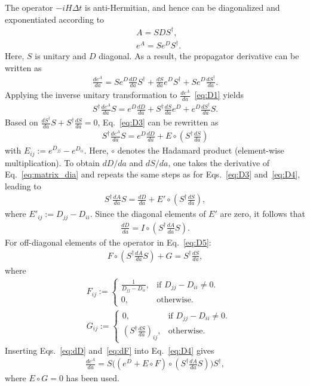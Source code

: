 \begin{appendices}
The operator $-iH\Delta t$ is anti-Hermitian, and hence can be diagonalized and exponentiated according to 
\begin{align}
\label{eq:matrix_dia}    &A=SDS^\dagger,\\
    &e^A=Se^DS^\dagger.
\end{align}
Here, $S$ is unitary and $D$ diagonal. As a result, the propagator derivative can be written as
\begin{align}
\label{eq:D1}
    \frac{d e^{A}}{d a}=Se^D\frac{dD}{da}S^\dagger+\frac{dS}{da}e^DS^\dagger+Se^D\frac{dS^\dagger}{da}.
\end{align}
Applying the inverse unitary transformation to $\frac{d e^{A}}{d a}$~\eqref{eq:D1} yields
\begin{align}
\label{eq:D3}
    S^\dagger\frac{de^A}{da}S=e^D\frac{dD}{da}+S^\dagger\frac{dS}{da}e^D+e^D\frac{dS^\dagger}{da}S.
\end{align}
Based on $\frac{dS^\dagger}{da}S+S^\dagger\frac{dS}{da}=0$, Eq.~\eqref{eq:D3} can be rewritten as 
\begin{align}
\label{eq:D4}
    S^\dagger \frac{de^A}{da}S=e^D\frac{dD}{da}+E\circ(S^\dagger\frac{dS}{da})
\end{align}
with $E_{ij}:=e^{D_{jj}}-e^{D_{ii}}$. Here, $\circ$ denotes the Hadamard product (element-wise multiplication). To obtain $dD/da$ and $dS/da$, one takes the derivative of Eq.~\eqref{eq:matrix_dia} and repeats the same steps as for Eqs.~\eqref{eq:D3} and~\eqref{eq:D4}, leading to
\begin{align}
\label{eq:D5}
    S^\dagger\frac{dA}{da}S=\frac{dD}{da}+E'\circ(S^\dagger\frac{dS}{da}),
\end{align}
where $E'_{ij}:=D_{jj}-D_{ii}$. 
Since the diagonal elements of $E'$ are zero, it follows that
\begin{align}
\label{eq:dD}
    \frac{dD}{da}=I\circ (S^\dagger\frac{dA}{da}S).
\end{align}
For off-diagonal elements of the operator in Eq.~\eqref{eq:D5}:
\begin{align}
\label{eq:dF}
    F\circ (S^\dagger\frac{dA}{da}S)+G=S^\dagger\frac{dS}{da},
\end{align}
where 
\begin{align}
    &F_{ij}:=
  \begin{cases}
    \frac{1}{D_{jj}-D_{ii}},& \text{if $D_{jj}-D_{ii} \neq 0$}.\\
    0, & \text{otherwise}.
  \end{cases}\\
\nonumber  &G_{ij}:=
  \begin{cases}
    0, & \text{if $D_{jj}-D_{ii} \neq 0$}.\\
    (S^\dagger\frac{dS}{da})_{ij}, & \text{otherwise}.
\end{cases}
\end{align}
Inserting Eqs.~\eqref{eq:dD} and~\eqref{eq:dF} into Eq.~\eqref{eq:D4} gives
\begin{align}
\label{eq:propagator_der}
    \frac{de^A}{da}=S\big((e^D+E \circ F)\circ(S^\dagger \frac{dA}{da}S)\big)S^\dagger,
\end{align}
where $E\circ G=0$ has been used. 


\end{appendices}
